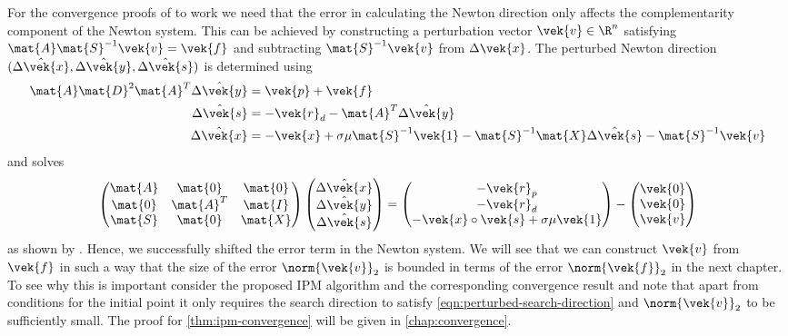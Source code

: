 For the convergence proofs of \textcite{Monteiro-ConvergenceAnalysisLongStepInfeasibleIPMs} to work we need that the error in calculating the Newton direction only affects the complementarity component of the Newton system.
This can be achieved by constructing a perturbation vector \(\vek{v} \in \R^n\) satisfying \(\mat{A}\mat{S}^{-1}\vek{v} = \vek{f}\) and subtracting \(\mat{S}^{-1}\vek{v}\) from \(\Delta\vek{x}\).
The perturbed Newton direction \((\hat{\Delta\vek{x}}, \hat{\Delta\vek{y}}, \hat{\Delta\vek{s}})\) is determined using
\begin{subequations}
  \begin{align}
    \mat{A} \mat{D}^2 \mat{A}^T \hat{\Delta\vek{y}} &= \vek{p} + \vek{f} \\
    \hat{\Delta\vek{s}} &= -\vek{r}_d - \mat{A}^T \hat{\Delta\vek{y}} \\
    \hat{\Delta\vek{x}} &= -\vek{x} + \sigma \mu \mat{S}^{-1} \vek{1} - \mat{S}^{-1} \mat{X} \hat{\Delta\vek{s}} - \mat{S}^{-1} \vek{v}
  \end{align}
\end{subequations}
and solves
\begin{equation}\label{eqn:perturbed-search-direction}
  \begin{pmatrix}
    \mat{A} & \mat{0}   & \mat{0} \\
    \mat{0} & \mat{A}^T & \mat{I} \\
    \mat{S} & \mat{0}   & \mat{X} \\
  \end{pmatrix}
  \begin{pmatrix} \hat{\Delta\vek{x}} \\ \hat{\Delta\vek{y}} \\ \hat{\Delta\vek{s}} \end{pmatrix}
  =
  \begin{pmatrix} -\vek{r}_p \\ -\vek{r}_d \\ -\vek{x} \circ \vek{s} + \sigma \mu \vek{1} \end{pmatrix}
  -
  \begin{pmatrix} \vek{0} \\ \vek{0} \\ \vek{v} \end{pmatrix}
\end{equation}
as shown by \textcite[p. 10]{Monteiro-ConvergenceAnalysisLongStepInfeasibleIPMs}.
Hence, we successfully shifted the error term in the Newton system.
We will see that we can construct \(\vek{v}\) from \(\vek{f}\) in such a way that the size of the error \(\norm{\vek{v}}_2\) is bounded in terms of the error \(\norm{\vek{f}}_2\) in the next chapter.
To see why this is important consider the proposed IPM algorithm and the corresponding convergence result
and note that apart from conditions for the initial point it only requires the search direction to satisfy \cref{eqn:perturbed-search-direction} and \(\norm{\vek{v}}_2\) to be sufficiently small.
The proof for \cref{thm:ipm-convergence} will be given in \cref{chap:convergence}.

